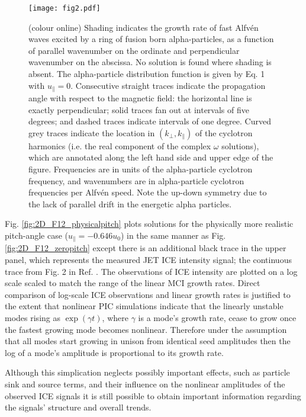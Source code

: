\documentclass[12pt]{iopart}
\begin{document}
\begin{figure}[ht!]
    \raggedleft
\texttt{[image: fig2.pdf]}
    \caption{(colour online) Shading indicates the growth rate of fast
    Alfv{\'e}n waves excited by a ring of fusion born alpha-particles, as a
    function of parallel wavenumber on the ordinate and perpendicular wavenumber
    on the abscissa. No solution is found where shading is absent. The
    alpha-particle distribution function is given by Eq. 1 with
    $u_{\parallel} = 0$. Consecutive straight traces indicate the propagation
    angle with respect to the magnetic field: the horizontal line is exactly
    perpendicular; solid traces fan out at intervals of five degrees; and dashed
    traces indicate intervals of one degree. Curved grey traces indicate the
    location in $(k_\perp, k_\parallel)$ of the cyclotron harmonics (i.e. the
    real component of the complex $\omega$ solutions), which are annotated along
    the left hand side and upper edge of the figure. Frequencies are in units of
    the alpha-particle cyclotron frequency, and wavenumbers are in
    alpha-particle cyclotron frequencies per Alfv{\'e}n speed. Note the up-down
    symmetry due to the lack of parallel drift in the energetic alpha
    particles.}
    \label{fig:2D_imag_zeropitch}
\end{figure}

Fig. \ref{fig:2D_F12_physicalpitch} plots solutions for the physically more
realistic pitch-angle
case ($u_\parallel = -0.646 u_0$) in the same manner as Fig.
\ref{fig:2D_F12_zeropitch} except there is an additional black trace in the
upper panel, which represents the measured JET ICE intensity signal; the continuous
trace from Fig. 2 in Ref. \cite{Cottrell1993}.
The observations of ICE intensity are plotted on a log scale scaled to match
the range of the linear MCI growth rates.
Direct comparison of log-scale
ICE observations and linear growth rates is justified to the extent that
nonlinear PIC simulations indicate that the linearly unstable modes rising
as $\exp(\gamma t)$, where $\gamma$ is a mode's growth rate,
cease to grow once the fastest growing mode becomes
nonlinear\cite{Cook2013}.
Therefore under the assumption that all modes start growing in unison from
identical seed amplitudes then the log of a mode's amplitude is
proportional to its growth rate.

Although this simplication neglects possibly important effects, such as particle sink
and source terms, and their influence on the nonlinear amplitudes of the
observed ICE signals it is still possible to obtain important information
regarding the signals' structure and overall trends.
\end{document}
